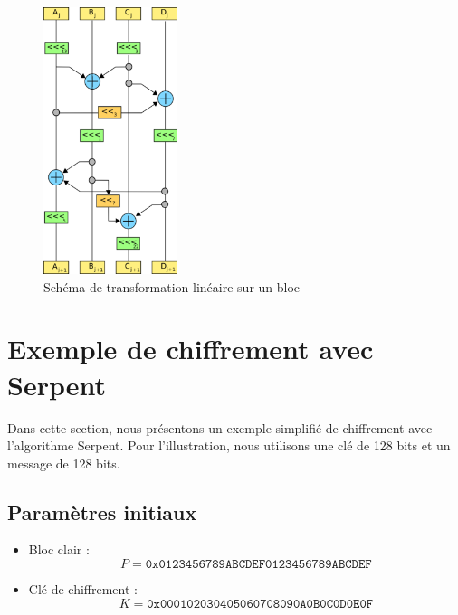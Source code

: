\documentclass[12pt,a4paper]{report}
\begin{document}
\begin{figure}[h]
    \centering
    \includegraphics[width=0.35\textwidth]{assets/serpent-global.png}
    \caption{Schéma de transformation linéaire sur un bloc}
\end{figure}









\section*{Exemple de chiffrement avec Serpent}

\setcounter{subsection}{0}

Dans cette section, nous présentons un exemple simplifié de chiffrement avec
l’algorithme Serpent.  
Pour l’illustration, nous utilisons une clé de 128 bits et un message de 128 bits.

\subsection{Paramètres initiaux}

\begin{itemize}
    \item Bloc clair : 
    \[
        P = \texttt{0x0123456789ABCDEF0123456789ABCDEF}
    \]
    \item Clé de chiffrement : 
    \[
        K = \texttt{0x000102030405060708090A0B0C0D0E0F}
    \]
\end{itemize}
\end{document}

